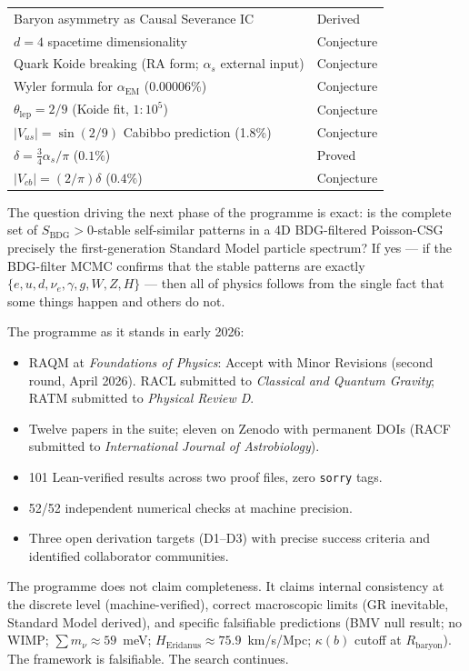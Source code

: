 \documentclass[11pt,a4paper]{article}
\newcommand{\SBDG}{S_{\mathrm{BDG}}}
\begin{document}
\begin{center}
\begin{tabular}{ll}
Baryon asymmetry as Causal Severance IC & Derived \\
$d = 4$ spacetime dimensionality & Conjecture \\
Quark Koide breaking (RA form; $\alpha_s$ external input) & Conjecture \\
Wyler formula for $\alpha_{\mathrm{EM}}$ (0.00006\%) & Conjecture \\
$\theta_{\mathrm{lep}} = 2/9$ (Koide fit, $1:10^5$) & Conjecture \\
$|V_{us}| = \sin(2/9)$ Cabibbo prediction (1.8\%) & Conjecture \\
$\delta = \tfrac{3}{4}\alpha_s/\pi$ ($0.1\%$) & Proved \\
$|V_{cb}| = (2/\pi)\delta$ ($0.4\%$) & Conjecture \\
\bottomrule
\end{tabular}
\end{center}

\medskip
The question driving the next phase of the programme is exact:
is the complete set of $\SBDG > 0$-stable self-similar patterns
in a 4D BDG-filtered Poisson-CSG precisely the first-generation
Standard Model particle spectrum? If yes --- if the BDG-filter MCMC
confirms that the stable patterns are exactly $\{e, u, d, \nu_e,
\gamma, g, W, Z, H\}$ --- then all of physics follows from the
single fact that some things happen and others do not.

\medskip
The programme as it stands in early 2026:
\begin{itemize}[noitemsep]
  \item RAQM at \emph{Foundations of Physics}: Accept with Minor Revisions
  (second round, April 2026).
  RACL submitted to \emph{Classical and Quantum Gravity};
  RATM submitted to \emph{Physical Review D}.
  \item Twelve papers in the suite; eleven on Zenodo with permanent
  DOIs (RACF submitted to \emph{International Journal of Astrobiology}).
  \item 101 Lean-verified results across two proof files, zero
  \texttt{sorry} tags.
  \item 52/52 independent numerical checks at machine precision.
  \item Three open derivation targets (D1--D3) with precise
  success criteria and identified collaborator communities.
\end{itemize}

The programme does not claim completeness. It claims internal consistency
at the discrete level (machine-verified), correct macroscopic limits
(GR inevitable, Standard Model derived), and specific falsifiable
predictions (BMV null result; no WIMP; $\sum m_\nu \approx 59$~meV;
$H_{\mathrm{Eridanus}} \approx 75.9$~km/s/Mpc; $\kappa(b)$ cutoff at
$R_{\mathrm{baryon}}$). The framework is falsifiable. The search continues.
\end{document}
